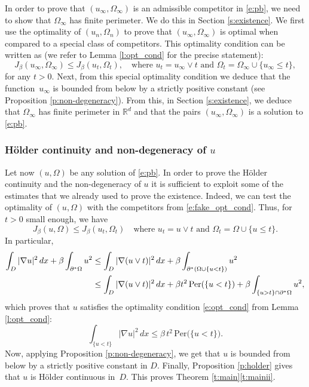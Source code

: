 \documentclass[JEP,XML,SOM,Unicode]{cedram}
\newcommand{\Per}{\mathrm{Per}}
\theoremstyle{plain}
\theoremstyle{definition}
\def\R{\mathbb{R}}
\begin{document}
In order to prove that $(u_\infty,\Omega_\infty)$ is an admissible competitor in \eqref{e:pb}, we need to show that $\Omega_\infty$ has finite perimeter. We do this in Section \ref{s:existence}.
We first use the optimality of $(u_n,\Omega_n)$ to prove that $(u_\infty,\Omega_\infty)$ is optimal when compared to a special class of competitors. This optimality condition can be written as (we refer to Lemma \ref{l:opt_cond} for the precise statement):
\begin{equation}\label{e:fake_opt_cond}
J_\beta(u_\infty,\Omega_\infty)\le J_\beta(u_t,\Omega_t),\quad\text{where $u_t=u_\infty\vee t$ and $\Omega_t=\Omega_\infty\cup \{u_\infty\le t\}$},
\end{equation}
for any $t>0$. Next, from this special optimality condition we deduce that the function~$u_\infty$ is bounded from below by a strictly positive constant (see Proposition \ref{p:non-degeneracy}). From this, in Section \ref{s:existence}, we deduce that $\Omega_\infty$ has finite perimeter in $\R^d$ and that the pairs $(u_\infty,\Omega_\infty)$ is a solution to \eqref{e:pb}.

\subsubsection{Hölder continuity and non-degeneracy of $u$} Let now $(u,\Omega)$ be any solution of \eqref{e:pb}. In order to prove the Hölder continuity and the non-degeneracy of $u$ it is sufficient to exploit some of the estimates that we already used to prove the existence. Indeed, we can test the optimality of $(u,\Omega)$ with the competitors from \eqref{e:fake_opt_cond}. Thus, for $t>0$ small enough, we have
\begin{equation}%
J_\beta(u,\Omega)\le J_\beta(u_t,\Omega_t)\quad\text{where $u_t=u\vee t$ and $\Omega_t=\Omega\cup \{u\le t\}$}.
\end{equation}
In particular,
\begin{align}
\int_{D}|\nabla u|^2\,dx+\beta\int_{\partial^\ast\Omega}u^2\notag&\le \int_{D}|\nabla (u\vee t)|^2\,dx+\beta\int_{\partial^\ast(\Omega\cup\{u<t\})}u^2\notag\\
&\le \int_{D}|\nabla (u\vee t)|^2\,dx+\beta t^2\, \Per(\{u<t\})+\beta\int_{\{u> t\}\cap \partial^\ast\Omega}u^2,\notag
\end{align}
which proves that $u$ satisfies the optimality condition \eqref{e:opt_cond} from Lemma \ref{l:opt_cond}:
\begin{equation}%
\int_{\{u<t\}}|\nabla u|^2\,dx\le \beta\, t^2\, \Per\big(\{u<t\}\big).
\end{equation}
Now, applying Proposition \ref{p:non-degeneracy}, we get that $u$ is bounded from below by a strictly positive constant in $D$. Finally, Proposition \ref{p:holder} gives that $u$ is Hölder continuous in~$D$. This proves Theorem \ref{t:main}\eqref{t:mainii}.
\end{document}

